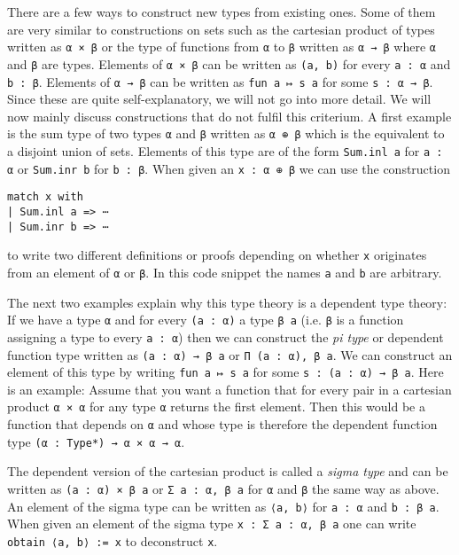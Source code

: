 There are a few ways to construct new types from existing ones. 
Some of them are very similar to constructions on sets such as the cartesian product of types written as \lstinline{α × β} or the type of functions from \lstinline{α} to \lstinline{β} written as \lstinline{α → β} where \lstinline{α} and \lstinline{β} are types.
Elements of \lstinline{α × β} can be written as \lstinline{(a, b)} for every \lstinline{a : α} and \lstinline{b : β}.
Elements of \lstinline{α → β} can be written as \lstinline{fun a ↦ s a} for some \lstinline{s : α → β}. 
Since these are quite self-explanatory, we will not go into more detail.
We will now mainly discuss constructions that do not fulfil this criterium. 
A first example is the sum type of two types \lstinline{α} and \lstinline{β} written as \lstinline{α ⊕ β} which is the equivalent to a disjoint union of sets. 
Elements of this type are of the form \lstinline{Sum.inl a} for \lstinline{a : α} or \lstinline{Sum.inr b} for \lstinline{b : β}.
When given an \lstinline{x : α ⊕ β} we can use the construction 

\begin{lstlisting}
match x with 
| Sum.inl a => ⋯ 
| Sum.inr b => ⋯
\end{lstlisting}

to write two different definitions or proofs depending on whether \lstinline{x} originates from an element of \lstinline{α} or \lstinline{β}. 
In this code snippet the names \lstinline{a} and \lstinline{b} are arbitrary.

The next two examples explain why this type theory is a dependent type theory:
If we have a type \lstinline{α} and for every \lstinline{(a : α)} a type \lstinline{β a} (i.e. \lstinline{β} is a function assigning a type to every \lstinline{a : α}) then we can construct the \emph{pi type} or dependent function type written as \lstinline{(a : α) → β a} or \lstinline{Π (a : α), β a}. 
We can construct an element of this type by writing \lstinline{fun a ↦ s a} for some \lstinline{s : (a : α) → β a}. 
Here is an example: 
Assume that you want a function that for every pair in a cartesian product \lstinline{α × α} for any type \lstinline{α} returns the first element. 
Then this would be a function that depends on \lstinline{α} and whose type is therefore the dependent function type \lstinline{(α : Type*) → α × α → α}.

The dependent version of the cartesian product is called a \emph{sigma type} and can be written as \lstinline{(a : α) × β a} or \lstinline{Σ a : α, β a} for \lstinline{α} and \lstinline{β} the same way as above. 
An element of the sigma type can be written as \lstinline{⟨a, b⟩} for \lstinline{a : α} and \lstinline{b : β a}. 
When given an  element of the sigma type \lstinline{x : Σ a : α, β a} one can write \lstinline{obtain ⟨a, b⟩ := x} to deconstruct \lstinline{x}.